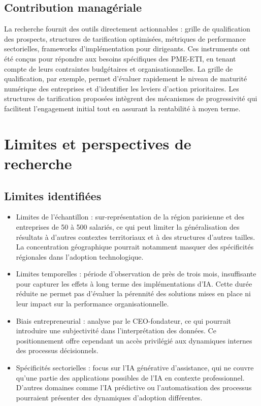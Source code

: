 \subsection{Contribution managériale}
La recherche fournit des outils directement actionnables : grille de qualification des prospects, structures de tarification optimisées, métriques de performance sectorielles, frameworks d’implémentation pour dirigeants. Ces instruments ont été conçus pour répondre aux besoins spécifiques des PME-ETI, en tenant compte de leurs contraintes budgétaires et organisationnelles. La grille de qualification, par exemple, permet d'évaluer rapidement le niveau de maturité numérique des entreprises et d'identifier les leviers d'action prioritaires. Les structures de tarification proposées intègrent des mécanismes de progressivité qui facilitent l'engagement initial tout en assurant la rentabilité à moyen terme.

\section{Limites et perspectives de recherche}

\subsection{Limites identifiées}
\begin{itemize}
    \item Limites de l’échantillon : sur-représentation de la région parisienne et des entreprises de 50 à 500 salariés, ce qui peut limiter la généralisation des résultats à d'autres contextes territoriaux et à des structures d'autres tailles. La concentration géographique pourrait notamment masquer des spécificités régionales dans l'adoption technologique.
    \item Limites temporelles : période d’observation de près de trois mois, insuffisante pour capturer les effets à long terme des implémentations d'IA. Cette durée réduite ne permet pas d'évaluer la pérennité des solutions mises en place ni leur impact sur la performance organisationnelle.
    \item Biais entrepreneurial : analyse par le CEO-fondateur, ce qui pourrait introduire une subjectivité dans l'interprétation des données. Ce positionnement offre cependant un accès privilégié aux dynamiques internes des processus décisionnels.
    \item Spécificités sectorielles : focus sur l’IA générative d’assistance, qui ne couvre qu’une partie des applications possibles de l'IA en contexte professionnel. D'autres domaines comme l'IA prédictive ou l'automatisation des processus pourraient présenter des dynamiques d'adoption différentes.
\end{itemize}

